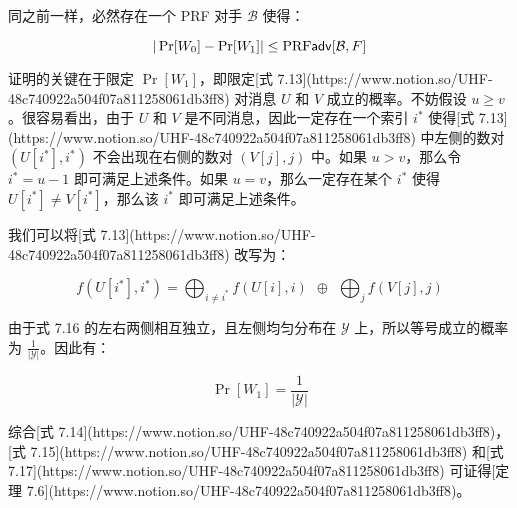 同之前一样，必然存在一个 PRF 对手 $\mathcal{B}$ 使得：

$$
|\Pr[W_0]-\Pr[W_1]|\leq{\rm PRF}\mathsf{adv}[\mathcal{B},F]
$$

证明的关键在于限定 $\Pr[W_1]$，即限定[式 7.13](https://www.notion.so/UHF-48c740922a504f07a811258061db3ff8) 对消息 $U$ 和 $V$ 成立的概率。不妨假设 $u\geq v$。很容易看出，由于 $U$ 和 $V$ 是不同消息，因此一定存在一个索引 $i^*$ 使得[式 7.13](https://www.notion.so/UHF-48c740922a504f07a811258061db3ff8) 中左侧的数对 $(U[i^*],i^*)$ 不会出现在右侧的数对 $(V[j],j)$ 中。如果 $u>v$，那么令 $i^*=u-1$ 即可满足上述条件。如果 $u=v$，那么一定存在某个 $i^*$ 使得 $U[i^*]\neq V[i^*]$，那么该 $i^*$ 即可满足上述条件。

我们可以将[式 7.13](https://www.notion.so/UHF-48c740922a504f07a811258061db3ff8) 改写为：

$$
f(U[i^*],i^*)=\bigoplus_{i\neq i^*}f(U[i],i)~~\oplus~~\bigoplus_jf(V[j],j)
$$

由于式 7.16 的左右两侧相互独立，且左侧均匀分布在 $\mathcal{Y}$ 上，所以等号成立的概率为 $\frac{1}{|\mathcal{Y}|}$。因此有：

$$
\Pr[W_1]=\frac{1}{|\mathcal{Y}|} 
$$

综合[式 7.14](https://www.notion.so/UHF-48c740922a504f07a811258061db3ff8)，[式 7.15](https://www.notion.so/UHF-48c740922a504f07a811258061db3ff8) 和[式 7.17](https://www.notion.so/UHF-48c740922a504f07a811258061db3ff8) 可证得[定理 7.6](https://www.notion.so/UHF-48c740922a504f07a811258061db3ff8)。